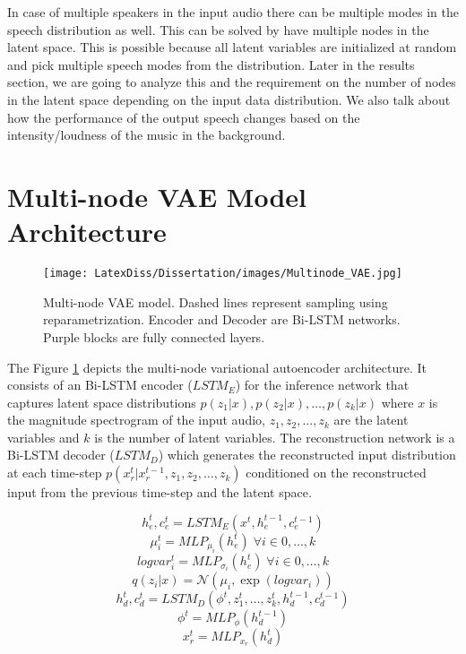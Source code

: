 In case of multiple speakers in the input audio there can be multiple modes in the speech distribution as well. This can be solved by have multiple nodes in the latent space. This is possible because all latent variables are initialized at random and pick multiple speech modes from the distribution. Later in the results section, we are going to analyze this and the requirement on the number of nodes in the latent space depending on the input data distribution. We also talk about how the performance of the output speech changes based on the intensity/loudness of the music in the background.

\section{Multi-node VAE Model Architecture}


\begin{figure}
    \centering
    \texttt{[image: LatexDiss/Dissertation/images/Multinode\_VAE.jpg]}
    \caption{Multi-node VAE model. Dashed lines represent sampling using reparametrization. Encoder and Decoder are Bi-LSTM networks. Purple blocks are fully connected layers.}
    \label{fig:VAE}
\end{figure}

The Figure \ref{fig:VAE} depicts the multi-node variational autoencoder architecture. It consists of an Bi-LSTM encoder ($LSTM_E$) for the inference network that captures latent space distributions $p(z_1|x), p(z_2|x), \dots, p(z_k|x)$ where $x$ is the magnitude spectrogram of the input audio, $z_1, z_2, \dots, z_k$ are the latent variables and $k$ is the number of latent variables. The reconstruction network is a Bi-LSTM decoder ($LSTM_D$) which generates the reconstructed input distribution at each time-step $p(x_r^t|x_r^{t-1},z_1,z_2,\dots,z_k)$ conditioned on the reconstructed input from the previous time-step and the latent space. 

\begin{equation}
h_e^t, c_e^t = LSTM_E(x^t,h_e^{t-1},c_e^{t-1})
\end{equation}
\begin{equation}
\mu_i^t = MLP_{\mu_i}(h_e^t) \; \forall i \in {0,\dots,k}
\end{equation}
\begin{equation}
logvar_i^t = MLP_{\sigma_i}(h_e^t) \; \forall i \in {0,\dots,k}
\end{equation}
\begin{equation}
q(z_i|x) = \mathcal{N}(\mu_i,\exp(logvar_i))
\end{equation}
\begin{equation}
h_{d}^t, c_{d}^t = LSTM_D(\phi^t, z_1^t, \dots, z_k^t,h_d^{t-1},c_d^{t-1})
\end{equation}
\begin{equation}
\phi^t = MLP_{\phi}(h_d^{t-1})
\end{equation}
\begin{equation}
x_r^t = MLP_{x_r}(h_d^t)
\end{equation}

